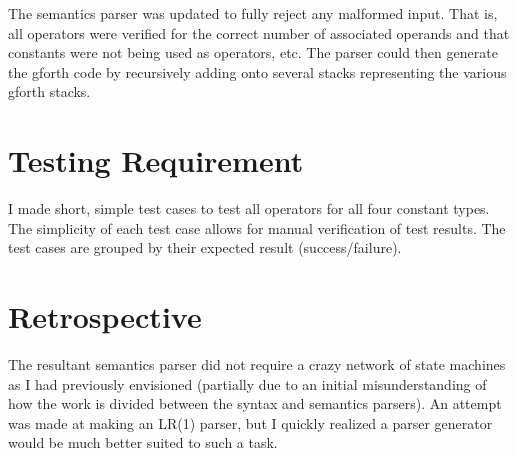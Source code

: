 \documentclass[12pt,letterpaper]{article}
\begin{document}
The semantics parser was updated to fully reject any malformed input. That is,
all operators were verified for the correct number of associated operands and
that constants were not being used as operators, etc. The parser could then
generate the gforth code by recursively adding onto several stacks representing
the various gforth stacks.

\section*{Testing Requirement}

I made short, simple test cases to test all operators for all four constant
types. The simplicity of each test case allows for manual verification of test
results. The test cases are grouped by their expected result (success/failure).

\section*{Retrospective}

The resultant semantics parser did not require a crazy network of state
machines as I had previously envisioned (partially due to an initial
misunderstanding of how the work is divided between the syntax and semantics
parsers). An attempt was made at making an LR(1) parser, but I quickly realized
a parser generator would be much better suited to such a task.
\end{document}
